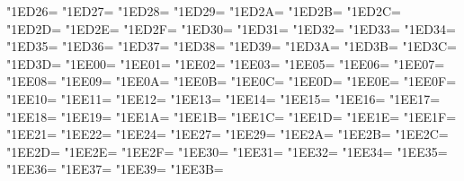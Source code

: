 \XeTeXcharclass"1ED26=\KclassArabU
\XeTeXcharclass"1ED27=\KclassArabU
\XeTeXcharclass"1ED28=\KclassArabU
\XeTeXcharclass"1ED29=\KclassArabU
\XeTeXcharclass"1ED2A=\KclassArabU
\XeTeXcharclass"1ED2B=\KclassArabU
\XeTeXcharclass"1ED2C=\KclassArabU
\XeTeXcharclass"1ED2D=\KclassArabU
\XeTeXcharclass"1ED2E=\KclassArabU
\XeTeXcharclass"1ED2F=\KclassArabU
\XeTeXcharclass"1ED30=\KclassArabU
\XeTeXcharclass"1ED31=\KclassArabU
\XeTeXcharclass"1ED32=\KclassArabU
\XeTeXcharclass"1ED33=\KclassArabU
\XeTeXcharclass"1ED34=\KclassArabU
\XeTeXcharclass"1ED35=\KclassArabU
\XeTeXcharclass"1ED36=\KclassArabU
\XeTeXcharclass"1ED37=\KclassArabU
\XeTeXcharclass"1ED38=\KclassArabU
\XeTeXcharclass"1ED39=\KclassArabU
\XeTeXcharclass"1ED3A=\KclassArabU
\XeTeXcharclass"1ED3B=\KclassArabU
\XeTeXcharclass"1ED3C=\KclassArabU
\XeTeXcharclass"1ED3D=\KclassArabU
\XeTeXcharclass"1EE00=\KclassArabU
\XeTeXcharclass"1EE01=\KclassArabU
\XeTeXcharclass"1EE02=\KclassArabU
\XeTeXcharclass"1EE03=\KclassArabU
\XeTeXcharclass"1EE05=\KclassArabU
\XeTeXcharclass"1EE06=\KclassArabU
\XeTeXcharclass"1EE07=\KclassArabU
\XeTeXcharclass"1EE08=\KclassArabU
\XeTeXcharclass"1EE09=\KclassArabU
\XeTeXcharclass"1EE0A=\KclassArabU
\XeTeXcharclass"1EE0B=\KclassArabU
\XeTeXcharclass"1EE0C=\KclassArabU
\XeTeXcharclass"1EE0D=\KclassArabU
\XeTeXcharclass"1EE0E=\KclassArabU
\XeTeXcharclass"1EE0F=\KclassArabU
\XeTeXcharclass"1EE10=\KclassArabU
\XeTeXcharclass"1EE11=\KclassArabU
\XeTeXcharclass"1EE12=\KclassArabU
\XeTeXcharclass"1EE13=\KclassArabU
\XeTeXcharclass"1EE14=\KclassArabU
\XeTeXcharclass"1EE15=\KclassArabU
\XeTeXcharclass"1EE16=\KclassArabU
\XeTeXcharclass"1EE17=\KclassArabU
\XeTeXcharclass"1EE18=\KclassArabU
\XeTeXcharclass"1EE19=\KclassArabU
\XeTeXcharclass"1EE1A=\KclassArabU
\XeTeXcharclass"1EE1B=\KclassArabU
\XeTeXcharclass"1EE1C=\KclassArabU
\XeTeXcharclass"1EE1D=\KclassArabU
\XeTeXcharclass"1EE1E=\KclassArabU
\XeTeXcharclass"1EE1F=\KclassArabU
\XeTeXcharclass"1EE21=\KclassArabU
\XeTeXcharclass"1EE22=\KclassArabU
\XeTeXcharclass"1EE24=\KclassArabU
\XeTeXcharclass"1EE27=\KclassArabU
\XeTeXcharclass"1EE29=\KclassArabU
\XeTeXcharclass"1EE2A=\KclassArabU
\XeTeXcharclass"1EE2B=\KclassArabU
\XeTeXcharclass"1EE2C=\KclassArabU
\XeTeXcharclass"1EE2D=\KclassArabU
\XeTeXcharclass"1EE2E=\KclassArabU
\XeTeXcharclass"1EE2F=\KclassArabU
\XeTeXcharclass"1EE30=\KclassArabU
\XeTeXcharclass"1EE31=\KclassArabU
\XeTeXcharclass"1EE32=\KclassArabU
\XeTeXcharclass"1EE34=\KclassArabU
\XeTeXcharclass"1EE35=\KclassArabU
\XeTeXcharclass"1EE36=\KclassArabU
\XeTeXcharclass"1EE37=\KclassArabU
\XeTeXcharclass"1EE39=\KclassArabU
\XeTeXcharclass"1EE3B=\KclassArabU

